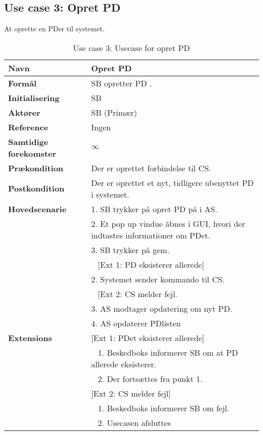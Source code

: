 \subsection{Use case 3: Opret \gls{PD}} \label{prodkat}
At oprette en \gls{PD}er til systemet.


\begin{table}[H]
\begin{tabularx}{\textwidth}{|l|X|}
\hline
\textbf{Navn}					& Opret \gls{PD} \\\hline
\textbf{Formål}					& \gls{SB} opretter \gls{PD} . \\\hline
\textbf{Initialisering}			& \gls{SB} \\\hline
\textbf{Aktører}				& \gls{SB} (Primær)\\\hline
\textbf{Reference}				& Ingen \\\hline
								
\textbf{Samtidige forekomster}	& $\infty$ \\\hline
\textbf{Prækondition}			& Der er oprettet forbindelse til \gls{CS}.
\\\hline
\textbf{Postkondition}			& Der er oprettet et nyt, tidligere ubenyttet \gls{PD} i systemet.
\\\hline
\textbf{Hovedscenarie}			& 1. \gls{SB} trykker på opret \gls{PD} på i \gls{AS}.\\												& 2. Et pop up vindue åbnes i \gls{GUI}, hvori der indtastes informationer om \gls{PD}et.\\
								& 3. \gls{SB} trykker på gem.\\
								& ~ [Ext 1: \gls{PD} eksisterer allerede] \\
								& 2. Systemet sender kommando til \gls{CS}.\\
								& ~ [Ext 2: \gls{CS} melder fejl.\\
								& 3. \gls{AS} modtager opdatering om nyt \gls{PD}. \\
								& 4. \gls{AS} opdaterer \gls{PD}listen \\\hline

\textbf{Extensions}						
								& [Ext 1: \gls{PD}et eksisterer allerede] \\
								& ~ 1. Beskedboks informerer \gls{SB} om at \gls{PD} allerede eksisterer.\\
								& ~ 2. Der fortsættes fra punkt 1.\\
									
								& [Ext 2: \gls{CS} melder fejl] \\
								& ~ 1. Beskedboks informerer \gls{SB} om fejl. \\
								& ~ 2. Usecasen afsluttes \\\hline
\end{tabularx}
\caption{Use case 3: Usecase for opret \gls{PD} }
\label{tab:UCop}
\end{table}
